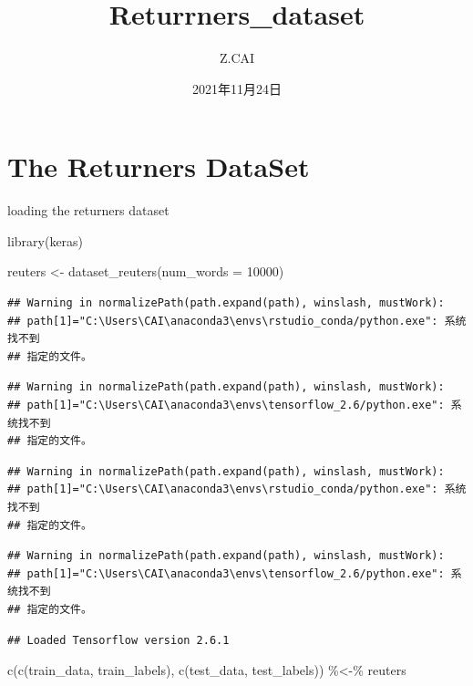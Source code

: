 \documentclass[]{article}
\title{Returrners\_dataset}
\author{Z.CAI}
\date{2021年11月24日}
\newenvironment{Shaded}{\begin{snugshade}}{\end{snugshade}}
\newcommand{\AttributeTok}[1]{\textcolor[rgb]{0.77,0.63,0.00}{#1}}
\newcommand{\DecValTok}[1]{\textcolor[rgb]{0.00,0.00,0.81}{#1}}
\newcommand{\FunctionTok}[1]{\textcolor[rgb]{0.00,0.00,0.00}{#1}}
\newcommand{\NormalTok}[1]{#1}
\newcommand{\OtherTok}[1]{\textcolor[rgb]{0.56,0.35,0.01}{#1}}
\newcommand{\SpecialCharTok}[1]{\textcolor[rgb]{0.00,0.00,0.00}{#1}}
\begin{document}
\maketitle

\hypertarget{the-returners-dataset}{%
\section{The Returners DataSet}\label{the-returners-dataset}}

loading the returners dataset

\begin{Shaded}
\begin{Highlighting}[]
\FunctionTok{library}\NormalTok{(keras)}

\NormalTok{reuters }\OtherTok{\textless{}{-}} \FunctionTok{dataset\_reuters}\NormalTok{(}\AttributeTok{num\_words =} \DecValTok{10000}\NormalTok{)}
\end{Highlighting}
\end{Shaded}

\begin{verbatim}
## Warning in normalizePath(path.expand(path), winslash, mustWork):
## path[1]="C:\Users\CAI\anaconda3\envs\rstudio_conda/python.exe": 系统找不到
## 指定的文件。
\end{verbatim}

\begin{verbatim}
## Warning in normalizePath(path.expand(path), winslash, mustWork):
## path[1]="C:\Users\CAI\anaconda3\envs\tensorflow_2.6/python.exe": 系统找不到
## 指定的文件。
\end{verbatim}

\begin{verbatim}
## Warning in normalizePath(path.expand(path), winslash, mustWork):
## path[1]="C:\Users\CAI\anaconda3\envs\rstudio_conda/python.exe": 系统找不到
## 指定的文件。
\end{verbatim}

\begin{verbatim}
## Warning in normalizePath(path.expand(path), winslash, mustWork):
## path[1]="C:\Users\CAI\anaconda3\envs\tensorflow_2.6/python.exe": 系统找不到
## 指定的文件。
\end{verbatim}

\begin{verbatim}
## Loaded Tensorflow version 2.6.1
\end{verbatim}

\begin{Shaded}
\begin{Highlighting}[]
\FunctionTok{c}\NormalTok{(}\FunctionTok{c}\NormalTok{(train\_data, train\_labels), }\FunctionTok{c}\NormalTok{(test\_data, test\_labels)) }\SpecialCharTok{\%\textless{}{-}\%}\NormalTok{ reuters}
\end{Highlighting}
\end{Shaded}
\end{document}

